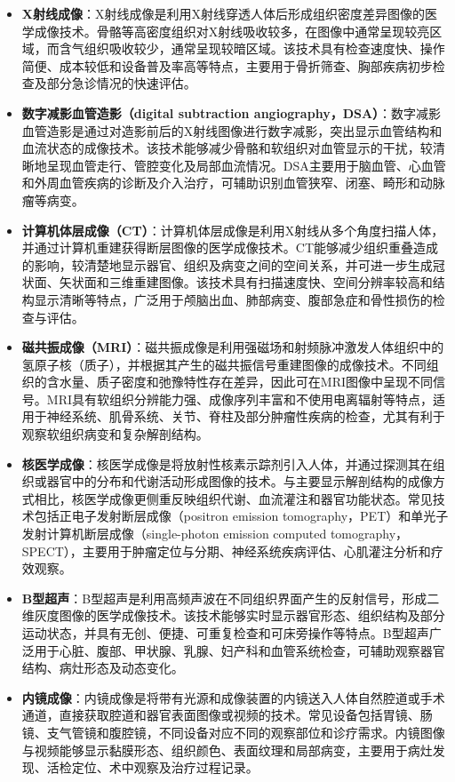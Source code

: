 \begin{itemize}
\item \textbf{X射线成像}：X射线成像是利用X射线穿透人体后形成组织密度差异图像的医学成像技术。骨骼等高密度组织对X射线吸收较多，在图像中通常呈现较亮区域，而含气组织吸收较少，通常呈现较暗区域。该技术具有检查速度快、操作简便、成本较低和设备普及率高等特点，主要用于骨折筛查、胸部疾病初步检查及部分急诊情况的快速评估。
\item \textbf{数字减影血管造影（digital subtraction angiography，DSA）}：数字减影血管造影是通过对造影前后的X射线图像进行数字减影，突出显示血管结构和血流状态的成像技术。该技术能够减少骨骼和软组织对血管显示的干扰，较清晰地呈现血管走行、管腔变化及局部血流情况。DSA主要用于脑血管、心血管和外周血管疾病的诊断及介入治疗，可辅助识别血管狭窄、闭塞、畸形和动脉瘤等病变。
\item \textbf{计算机体层成像（CT）}：计算机体层成像是利用X射线从多个角度扫描人体，并通过计算机重建获得断层图像的医学成像技术。CT能够减少组织重叠造成的影响，较清楚地显示器官、组织及病变之间的空间关系，并可进一步生成冠状面、矢状面和三维重建图像。该技术具有扫描速度快、空间分辨率较高和结构显示清晰等特点，广泛用于颅脑出血、肺部病变、腹部急症和骨性损伤的检查与评估。
\item \textbf{磁共振成像（MRI）}：磁共振成像是利用强磁场和射频脉冲激发人体组织中的氢原子核（质子），并根据其产生的磁共振信号重建图像的成像技术。不同组织的含水量、质子密度和弛豫特性存在差异，因此可在MRI图像中呈现不同信号。MRI具有软组织分辨能力强、成像序列丰富和不使用电离辐射等特点，适用于神经系统、肌骨系统、关节、脊柱及部分肿瘤性疾病的检查，尤其有利于观察软组织病变和复杂解剖结构。
\item \textbf{核医学成像}：核医学成像是将放射性核素示踪剂引入人体，并通过探测其在组织或器官中的分布和代谢活动形成图像的技术。与主要显示解剖结构的成像方式相比，核医学成像更侧重反映组织代谢、血流灌注和器官功能状态。常见技术包括正电子发射断层成像（positron emission tomography，PET）和单光子发射计算机断层成像（single-photon emission computed tomography，SPECT），主要用于肿瘤定位与分期、神经系统疾病评估、心肌灌注分析和疗效观察。
\item \textbf{B型超声}：B型超声是利用高频声波在不同组织界面产生的反射信号，形成二维灰度图像的医学成像技术。该技术能够实时显示器官形态、组织结构及部分运动状态，并具有无创、便捷、可重复检查和可床旁操作等特点。B型超声广泛用于心脏、腹部、甲状腺、乳腺、妇产科和血管系统检查，可辅助观察器官结构、病灶形态及动态变化。
\item \textbf{内镜成像}：内镜成像是将带有光源和成像装置的内镜送入人体自然腔道或手术通道，直接获取腔道和器官表面图像或视频的技术。常见设备包括胃镜、肠镜、支气管镜和腹腔镜，不同设备对应不同的观察部位和诊疗需求。内镜图像与视频能够显示黏膜形态、组织颜色、表面纹理和局部病变，主要用于病灶发现、活检定位、术中观察及治疗过程记录。
\end{itemize}

